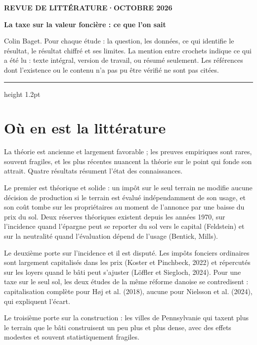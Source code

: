 \documentclass[11pt,a4paper]{article}
\begin{document}
\renewcommand{\figurename}{Figure}\renewcommand{\tablename}{Tableau}

\thispagestyle{empty}
\vspace*{0.4cm}
{\footnotesize\color{ocre}\bfseries REVUE DE LITTÉRATURE\quad·\quad OCTOBRE 2026\par}
\vspace{8pt}
{\fontsize{21}{25}\selectfont\bfseries\color{bleu}La taxe sur la valeur foncière : ce que l'on sait\par}
\vspace{8pt}
{\small Colin Baget. Pour chaque étude : la question, les données, ce qui identifie le résultat,
le résultat chiffré et ses limites. La mention entre crochets indique ce qui a été lu : texte
intégral, version de travail, ou résumé seulement. Les références dont l'existence ou le contenu
n'a pas pu être vérifié ne sont pas citées.\par}
\vspace{6pt}
{\color{bleu}\hrule height 1.2pt}

\section*{Où en est la littérature}

La théorie est ancienne et largement favorable ; les preuves empiriques sont rares, souvent
fragiles, et les plus récentes nuancent la théorie sur le point qui fonde son attrait. Quatre
résultats résument l'état des connaissances.

Le premier est théorique et solide : un impôt sur le seul terrain ne modifie aucune décision
de production si le terrain est évalué indépendamment de son usage, et son coût tombe sur les
propriétaires au moment de l'annonce par une baisse du prix du sol. Deux réserves théoriques
existent depuis les années 1970, sur l'incidence quand l'épargne peut se reporter du sol vers le
capital (Feldstein) et sur la neutralité quand l'évaluation dépend de l'usage (Bentick, Mills).

Le deuxième porte sur l'incidence et il est disputé. Les impôts fonciers ordinaires sont
largement capitalisés dans les prix (Koster et Pinchbeck, 2022) et répercutés sur les loyers
quand le bâti peut s'ajuster (Löffler et Siegloch, 2024). Pour une taxe sur le seul sol, les deux
études de la même réforme danoise se contredisent : capitalisation complète pour Høj et al. (2018),
aucune pour Nielsson et al. (2024), qui expliquent l'écart.

Le troisième porte sur la construction : les villes de Pennsylvanie qui taxent plus le terrain
que le bâti construisent un peu plus et plus dense, avec des effets modestes et souvent
statistiquement fragiles.
\end{document}
